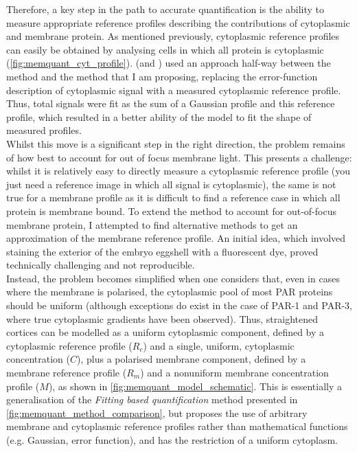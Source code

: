 \documentclass[12pt]{"article"}
\begin{document}
Therefore, a key step in the path to accurate quantification is the ability to measure appropriate reference profiles describing the contributions of cytoplasmic and membrane protein. As mentioned previously, cytoplasmic reference profiles can easily be obtained by analysing cells in which all protein is cytoplasmic (\cref{fig:memquant_cyt_profile}). \textcite{Reich2019a} (and \textcite{Reich2019}) used an approach half-way between the \textcite{Gross2018} method and the method that I am proposing, replacing the error-function description of cytoplasmic signal with a measured cytoplasmic reference profile. Thus, total signals were fit as the sum of a Gaussian profile and this reference profile, which resulted in a better ability of the model to fit the shape of measured profiles.\\

Whilst this move is a significant step in the right direction, the problem remains of how best to account for out of focus membrane light. This presents a challenge: whilst it is relatively easy to directly measure a cytoplasmic reference profile (you just need a reference image in which all signal is cytoplasmic), the same is not true for a membrane profile as it is difficult to find a reference case in which all protein is membrane bound. To extend the method to account for out-of-focus membrane protein, I attempted to find alternative methods to get an approximation of the membrane reference profile. An initial idea, which involved staining the exterior of the embryo eggshell with a fluorescent dye, proved technically challenging and not reproducible.\\

Instead, the problem becomes simplified when one considers that, even in cases where the membrane is polarised, the cytoplasmic pool of most PAR proteins should be uniform (although exceptions do exist in the case of PAR-1 and PAR-3, where true cytoplasmic gradients have been observed). Thus, straightened cortices can be modelled as a uniform cytoplasmic component, defined by a cytoplasmic reference profile ($R_c$) and a single, uniform, cytoplasmic concentration ($C$), plus a polarised membrane component, defined by a membrane reference profile ($R_m$) and a nonuniform membrane concentration profile ($M$), as shown in \cref{fig:memquant_model_schematic}. This is essentially a generalisation of the \textit{Fitting based quantification} method presented in \cref{fig:memquant_method_comparison}, but proposes the use of arbitrary membrane and cytoplasmic reference profiles rather than mathematical functions (e.g. Gaussian, error function), and has the restriction of a uniform cytoplasm.\\
\end{document}
